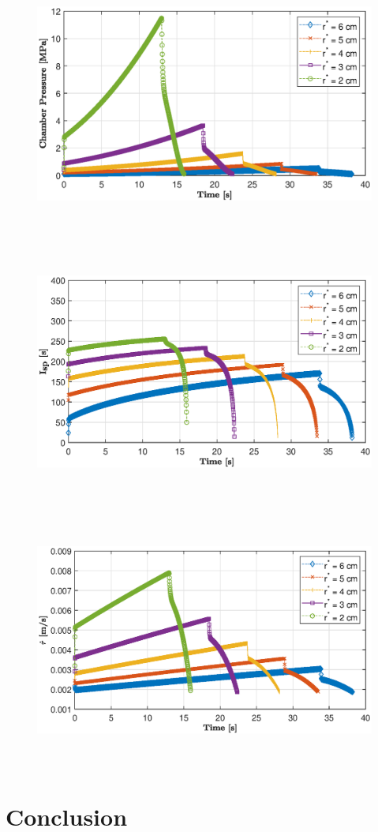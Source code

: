 \documentclass[letterpaper,12pt]{article}
\begin{document}
\begin{figure}
	\centering
	\includegraphics[height = 8.5cm]{graphs/q2_pc.eps}
\end{figure}
\begin{figure}
	\centering
	\includegraphics[height = 8.5cm]{graphs/q2_isp.eps}
\end{figure}
\begin{figure}
	\centering
	\includegraphics[height = 8.5cm]{graphs/q2_rdot.eps}
\end{figure}
\section{Conclusion}
\end{document}
